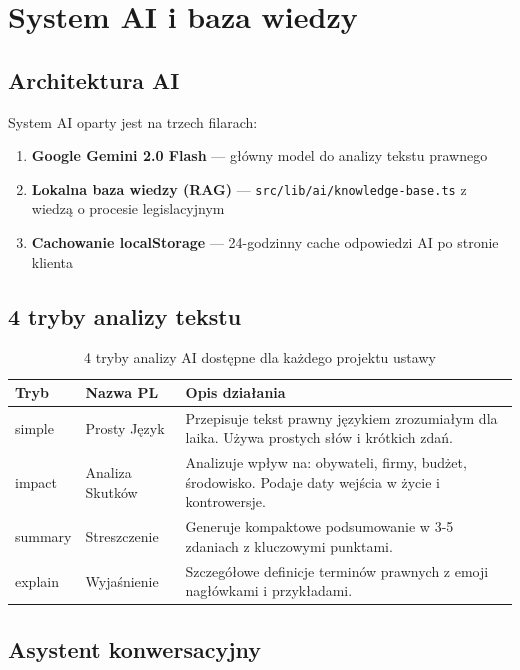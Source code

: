 \documentclass[12pt,a4paper]{article}
\begin{document}
\section{System AI i baza wiedzy}

\subsection{Architektura AI}

System AI oparty jest na trzech filarach:

\begin{enumerate}[leftmargin=2em]
  \item \textbf{Google Gemini 2.0 Flash} — główny model do analizy tekstu prawnego
  \item \textbf{Lokalna baza wiedzy (RAG)} — \texttt{src/lib/ai/knowledge-base.ts} z wiedzą o procesie legislacyjnym
  \item \textbf{Cachowanie localStorage} — 24-godzinny cache odpowiedzi AI po stronie klienta
\end{enumerate}

\subsection{4 tryby analizy tekstu}

\begin{table}[H]
\centering
\renewcommand{\arraystretch}{1.4}
\begin{tabularx}{\textwidth}{l l X}
\toprule
\textbf{Tryb} & \textbf{Nazwa PL} & \textbf{Opis działania} \\
\midrule
simple & Prosty Język & Przepisuje tekst prawny językiem zrozumiałym dla laika. Używa prostych słów i krótkich zdań. \\
impact & Analiza Skutków & Analizuje wpływ na: obywateli, firmy, budżet, środowisko. Podaje daty wejścia w życie i kontrowersje. \\
summary & Streszczenie & Generuje kompaktowe podsumowanie w 3-5 zdaniach z kluczowymi punktami. \\
explain & Wyjaśnienie & Szczegółowe definicje terminów prawnych z emoji nagłówkami i przykładami. \\
\bottomrule
\end{tabularx}
\caption{4 tryby analizy AI dostępne dla każdego projektu ustawy}
\end{table}

\subsection{Asystent konwersacyjny}
\end{document}
